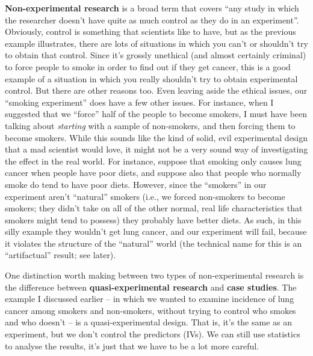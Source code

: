 \documentclass[
]{book}
\begin{document}
\textbf{Non-experimental research} is a broad term that covers ``any study in which the researcher doesn't have quite as much control as they do in an experiment''. Obviously, control is something that scientists like to have, but as the previous example illustrates, there are lots of situations in which you can't or shouldn't try to obtain that control. Since it's grossly unethical (and almost certainly criminal) to force people to smoke in order to find out if they get cancer, this is a good example of a situation in which you really shouldn't try to obtain experimental control. But there are other reasons too. Even leaving aside the ethical issues, our ``smoking experiment'' does have a few other issues. For instance, when I suggested that we ``force'' half of the people to become smokers, I must have been talking about {\emph{starting}} with a sample of non-smokers, and then forcing them to become smokers. While this sounds like the kind of solid, evil experimental design that a mad scientist would love, it might not be a very sound way of investigating the effect in the real world. For instance, suppose that smoking only causes lung cancer when people have poor diets, and suppose also that people who normally smoke do tend to have poor diets. However, since the ``smokers'' in our experiment aren't ``natural'' smokers (i.e., we forced non-smokers to become smokers; they didn't take on all of the other normal, real life characteristics that smokers might tend to possess) they probably have better diets. As such, in this silly example they wouldn't get lung cancer, and our experiment will fail, because it violates the structure of the ``natural'' world (the technical name for this is an ``artifactual'' result; see later).

One distinction worth making between two types of non-experimental research is the difference between \textbf{quasi-experimental research} and \textbf{case studies}. The example I discussed earlier -- in which we wanted to examine incidence of lung cancer among smokers and non-smokers, without trying to control who smokes and who doesn't -- is a quasi-experimental design. That is, it's the same as an experiment, but we don't control the predictors (IVs). We can still use statistics to analyse the results, it's just that we have to be a lot more careful.
\end{document}
